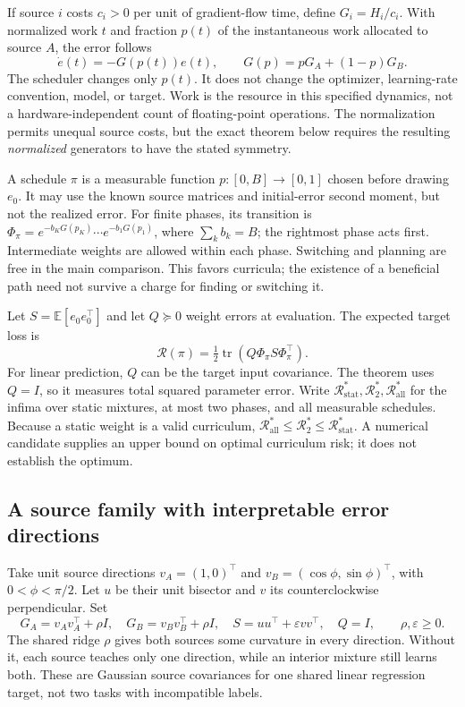 \documentclass{article}
\theoremstyle{remark}\newtheorem{remark}[theorem]{Remark}
\newcommand{\R}{\mathcal R}
\newcommand{\Rs}{\R_{\mathrm{stat}}^*}
\newcommand{\Rt}{\R_{2}^*}
\newcommand{\Ra}{\R_{\mathrm{all}}^*}
\newcommand{\tr}{\operatorname{tr}}
\newcommand{\E}{\mathbb E}
\begin{document}
If source $i$ costs $c_i>0$ per unit of gradient-flow time, define $G_i=H_i/c_i$. With normalized work $t$ and fraction $p(t)$ of the instantaneous work allocated to source $A$, the error follows
\begin{equation}
 \dot e(t)=-G(p(t))e(t),\qquad G(p)=pG_A+(1-p)G_B.\label{eq:dynamics}
\end{equation}
The scheduler changes only $p(t)$. It does not change the optimizer, learning-rate convention, model, or target. Work is the resource in this specified dynamics, not a hardware-independent count of floating-point operations. The normalization permits unequal source costs, but the exact theorem below requires the resulting \emph{normalized} generators to have the stated symmetry.

A schedule $\pi$ is a measurable function $p:[0,B]\to[0,1]$ chosen before drawing $e_0$. It may use the known source matrices and initial-error second moment, but not the realized error. For finite phases, its transition is
$\Phi_\pi=e^{-b_KG(p_K)}\cdots e^{-b_1G(p_1)}$, where $\sum_k b_k=B$; the rightmost phase acts first. Intermediate weights are allowed within each phase. Switching and planning are free in the main comparison. This favors curricula; the existence of a beneficial path need not survive a charge for finding or switching it.

Let $S=\E[e_0e_0^\top]$ and let $Q\succeq0$ weight errors at evaluation. The expected target loss is
\begin{equation}
 \R(\pi)=\tfrac12\tr(Q\Phi_\pi S\Phi_\pi^\top).\label{eq:risk}
\end{equation}
For linear prediction, $Q$ can be the target input covariance. The theorem uses $Q=I$, so it measures total squared parameter error. Write $\Rs,\Rt,\Ra$ for the infima over static mixtures, at most two phases, and all measurable schedules. Because a static weight is a valid curriculum, $\Ra\le\Rt\le\Rs$. A numerical candidate supplies an upper bound on optimal curriculum risk; it does not establish the optimum.

\subsection{A source family with interpretable error directions}
Take unit source directions $v_A=(1,0)^\top$ and $v_B=(\cos\phi,\sin\phi)^\top$, with $0<\phi<\pi/2$. Let $u$ be their unit bisector and $v$ its counterclockwise perpendicular. Set
\begin{equation}
 G_A=v_Av_A^\top+\rho I,\quad G_B=v_Bv_B^\top+\rho I,\quad
 S=uu^\top+\varepsilon vv^\top,\quad Q=I,\qquad \rho,\varepsilon\ge0.\label{eq:mainfamily}
\end{equation}
The shared ridge $\rho$ gives both sources some curvature in every direction. Without it, each source teaches only one direction, while an interior mixture still learns both. These are Gaussian source covariances for one shared linear regression target, not two tasks with incompatible labels.
\end{document}
